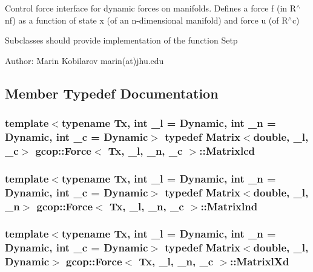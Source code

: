 \-Control force interface for dynamic forces on manifolds. \-Defines a force f (in \-R$^\wedge$nf) as a function of state x (of an n-\/dimensional manifold) and force u (of \-R$^\wedge$c)

\-Subclasses should provide implementation of the function \-Setp

\-Author\-: \-Marin \-Kobilarov marin(at)jhu.\-edu 

\subsection{\-Member \-Typedef \-Documentation}
\subsubsection[{\-Matrixlcd}]{\setlength{\rightskip}{0pt plus 5cm}template$<$typename \-Tx, int \-\_\-l = \-Dynamic, int \-\_\-n = \-Dynamic, int \-\_\-c = \-Dynamic$>$ typedef \-Matrix$<$double, \-\_\-l, \-\_\-c$>$ {\bf gcop\-::\-Force}$<$ \-Tx, \-\_\-l, \-\_\-n, \-\_\-c $>$\-::{\bf \-Matrixlcd}}\label{classgcop_1_1Force_a8697d670ab27677e50d5c73b774b6718}
\subsubsection[{\-Matrixlnd}]{\setlength{\rightskip}{0pt plus 5cm}template$<$typename \-Tx, int \-\_\-l = \-Dynamic, int \-\_\-n = \-Dynamic, int \-\_\-c = \-Dynamic$>$ typedef \-Matrix$<$double, \-\_\-l, \-\_\-n$>$ {\bf gcop\-::\-Force}$<$ \-Tx, \-\_\-l, \-\_\-n, \-\_\-c $>$\-::{\bf \-Matrixlnd}}\label{classgcop_1_1Force_a048bf1583e96796ea8834c29310ffa02}
\subsubsection[{\-Matrixl\-Xd}]{\setlength{\rightskip}{0pt plus 5cm}template$<$typename \-Tx, int \-\_\-l = \-Dynamic, int \-\_\-n = \-Dynamic, int \-\_\-c = \-Dynamic$>$ typedef \-Matrix$<$double, \-\_\-l, \-Dynamic$>$ {\bf gcop\-::\-Force}$<$ \-Tx, \-\_\-l, \-\_\-n, \-\_\-c $>$\-::{\bf \-Matrixl\-Xd}}\label{classgcop_1_1Force_aae079661473fa882b059b1392140ce80}
